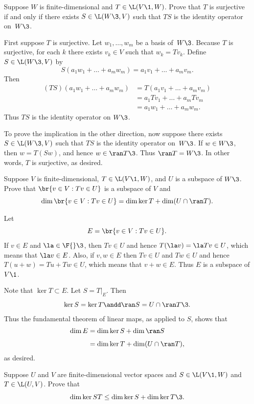 \exercise
Suppose $W$ is finite-dimensional and $T \in \L(V\1,W)$.  Prove that $T$  is
surjective if and only if there exists $S \in \L(W\3, V)$ such that $TS$ is the
identity operator  on~$W\3$.

\begin{Solution}
First suppose $T$ is surjective.  Let $w_1, \dots, w_m$ be a basis of~$W\3$.
Because $T$ is surjective, for each $k$ there exists $v_k \in V$ such that
$w_k = Tv_k$.  Define $S \in \L(W\3,V)$ by
\[
S(a_1 w_1 + \dots + a_m w_m) = a_1 v_1 + \dots + a_m v_m.
\]
Then
\begin{align*}
(TS)(a_1 w_1 + \dots + a_m w_m) &= T(a_1 v_1 + \dots + a_m v_m) \\
&= a_1 Tv_1 + \dots + a_m Tv_m \\
&= a_1 w_1 + \dots + a_m w_m.
\end{align*}
Thus $TS$ is the identity operator on $W\3$.

To prove the implication in the other direction, now suppose there exists
$S \in \L(W\3, V)$ such that $TS$ is the identity operator on~$W\3$.  If $w \in W\3$, then
$w = T(Sw)$, and hence $w \in \ran T\3$.  Thus $\ran T = W\3$.  In other words, $T$ is
surjective, as desired.
\end{Solution}

\exercise
Suppose $V$  is finite-dimensional, $T \in \L(V\1, W)$, and $U$ is a subspace of $W\3$. Prove that $\br{v \in V: Tv \in U}$ is a subspace of $V$ and\label{3diminv}
\[
\dim \br{v \in V: Tv \in U} = \dim \ker T + \dim (U \cap \ran T).
\]
\exercisedisplayend

\begin{Solution}
Let
\[
E = \br{v \in V: Tv \in U}.
\]
If $v \in E$ and $\la \in \F{}\3$, then $Tv \in U$ and hence $T(\la v) = \la T v \in U$, which means that $\la v \in E$. Also, if $v, w \in E$ then
$Tv \in U$ and $Tw \in U$ and hence $T(u + w) = Tu + Tw \in U$, which means that $v + w \in E$. Thus $E$ is a subspace of $V\1$.

Note that $\ker T \subset E$. Let $S = T|_E$. Then
\[
\ker S = \ker T \andd \ran S = U \cap \ran T\3.
\]
Thus the fundamental theorem of linear maps, as applied to $S$, shows that
\begin{align*}
\dim E &= \dim \ker S + \dim \ran S \\[4bp]
&= \dim \ker T + \dim (U \cap \ran T),
\end{align*}
as desired.
\end{Solution}

\exercise
Suppose $U$ and $V$ are finite-dimensional vector spaces and
\mbox{$S \in \L(V\1, W)$} and $T \in \L(U, V)$.  Prove that
\[
\dim \ker ST \le \dim \ker S + \dim \ker T\3.
\]
\exercisedisplayend

